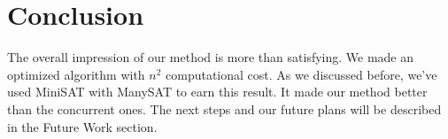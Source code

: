 \documentclass{article}
\begin{document}
\section{Conclusion}
The overall impression of our method is more than satisfying. We made an optimized algorithm with $n^2$ computational cost. As we discussed before, we've used MiniSAT with ManySAT to earn this result. It made our method better than the concurrent ones. The next steps and our future plans will be described in the Future Work section.
\end{document}
